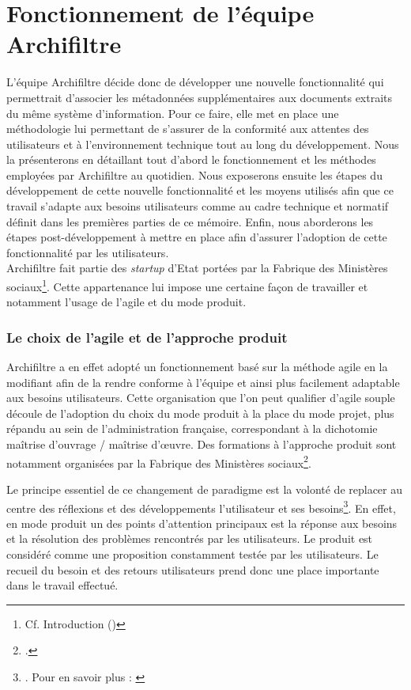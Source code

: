 \chapter{Fonctionnement de l’équipe Archifiltre}

L’équipe \gls{Archifiltre} décide donc de développer une nouvelle fonctionnalité qui permettrait d’associer les métadonnées supplémentaires aux documents extraits du même système d’information. Pour ce faire, elle met en place une méthodologie lui permettant de s’assurer de la conformité aux attentes des utilisateurs et à l’environnement technique tout au long du développement. Nous la présenterons en détaillant tout d’abord le fonctionnement et les méthodes employées par \gls{Archifiltre} au quotidien. Nous exposerons ensuite les étapes du développement de cette nouvelle fonctionnalité et les moyens utilisés afin que ce travail s’adapte aux besoins utilisateurs comme au cadre technique et normatif définit dans les premières parties de ce mémoire. Enfin, nous aborderons les étapes post-développement à mettre en place afin d'assurer l’adoption de cette fonctionnalité par les utilisateurs. \\


\gls{Archifiltre} fait partie des \textit{startup} d’Etat portées par la Fabrique des Ministères sociaux\footnote{Cf. Introduction (\pageref{Introduction})}. Cette appartenance lui impose une certaine façon de travailler et notamment l’usage de l’\gls{agile} et du mode produit.


\subsection{Le choix de l’agile et de l’approche produit}
\gls{Archifiltre} a en effet adopté un fonctionnement basé sur la méthode \gls{agile} en la modifiant afin de la rendre conforme à l’équipe et ainsi plus facilement adaptable aux besoins utilisateurs. Cette organisation que l’on peut qualifier d’\gls{agile} souple découle de l’adoption du choix du mode produit à la place du mode projet, plus répandu au sein de l’administration française, correspondant à la dichotomie maîtrise d’ouvrage / maîtrise d'œuvre. Des formations à l’\gls{approche produit} sont notamment organisées par la Fabrique des Ministères sociaux\footcite{betagouv_guide_2024}. 


Le principe essentiel de ce changement de paradigme est la volonté de replacer au centre des réflexions et des développements l’utilisateur et ses besoins\footnote{\cite{baheux_mode_2024}. Pour en savoir plus : \cite{sponheim_what_2024}}. En effet, en mode produit un des points d’attention principaux est la réponse aux besoins et la résolution des problèmes rencontrés par les utilisateurs. Le produit est considéré comme une proposition constamment testée par les utilisateurs. Le recueil du besoin et des retours utilisateurs prend donc une place importante dans le travail effectué.


